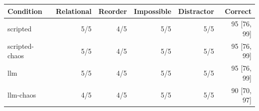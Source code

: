 \begin{tabular}{lrrrrr}
\toprule
Condition & Relational & Reorder & Impossible & Distractor & Correct \\
\midrule
scripted & 5/5 & 4/5 & 5/5 & 5/5 & 95 [76, 99] \\
scripted-chaos & 5/5 & 4/5 & 5/5 & 5/5 & 95 [76, 99] \\
llm & 5/5 & 4/5 & 5/5 & 5/5 & 95 [76, 99] \\
llm-chaos & 4/5 & 4/5 & 5/5 & 5/5 & 90 [70, 97] \\
\bottomrule
\end{tabular}

